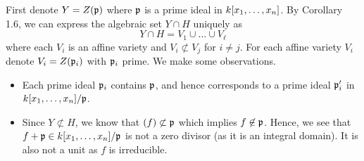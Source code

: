 \documentclass[10pt]{amsart}
\begin{document}
\begin{solution}
    \begin{luke}
        First denote $Y = Z(\mathfrak{p})$ where $\mathfrak{p}$ is a prime ideal in $k[x_1, \dots, x_n]$.
    By Corollary 1.6, we can express the algebraic set $Y \cap H$ uniquely as 
    \[
        Y \cap H = V_1 \cup \dots \cup V_{\ell}
    \]
    where each $V_i$ is an affine variety and $V_i \not\subset V_j$ for $i \ne j$. 
    For each affine variety $V_i$ denote $V_i = Z(\mathfrak{p}_i)$ with $\mathfrak{p}_i$ prime. 
    We make some observations. 
    \begin{itemize}
        \item Each prime ideal $\mathfrak{p}_i$ contains $\mathfrak{p}$, and hence corresponds to a 
        prime ideal $\mathfrak{p}_i'$ in $k[x_1, \dots, x_n]/\mathfrak{p}$.

        \item 
        Since $Y \not\subset H$, we know that $(f) \not\subset \mathfrak{p}$ which implies 
        $f \not\in \mathfrak{p}$. Hence, we see that $f + \mathfrak{p} \in k[x_1, \dots, x_n]/\mathfrak{p}$ 
        is not a zero divisor (as it is an integral domain). It is also not a unit as 
        $f$ is irreducible. 


\end{itemize}
\end{luke}
\end{solution}
\end{document}
